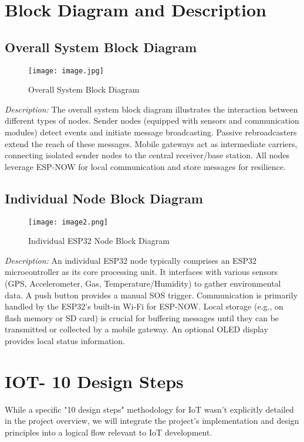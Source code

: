 \documentclass[12pt, a4paper]{article}
\begin{document}
\section{Block Diagram and Description} 
\subsection{Overall System Block Diagram}
\begin{figure}[H]
    \centering
    \texttt{[image: image.jpg]} %
    \caption{Overall System Block Diagram}
    \label{fig:system_block_diagram}
\end{figure}
\textit{Description:} The overall system block diagram illustrates the interaction between different types of nodes. Sender nodes (equipped with sensors and communication modules) detect events and initiate message broadcasting. Passive rebroadcasters extend the reach of these messages. Mobile gateways act as intermediate carriers, connecting isolated sender nodes to the central receiver/base station. All nodes leverage ESP-NOW for local communication and store messages for resilience.


\subsection{Individual Node Block Diagram}
\begin{figure}[H]
    \centering
    \texttt{[image: image2.png]} %
    \caption{Individual ESP32 Node Block Diagram}
    \label{fig:node_block_diagram}
\end{figure}
\textit{Description:} An individual ESP32 node typically comprises an ESP32 microcontroller as its core processing unit. It interfaces with various sensors (GPS, Accelerometer, Gas, Temperature/Humidity) to gather environmental data. A push button provides a manual SOS trigger. Communication is primarily handled by the ESP32's built-in Wi-Fi for ESP-NOW. Local storage (e.g., on flash memory or SD card) is crucial for buffering messages until they can be transmitted or collected by a mobile gateway. An optional OLED display provides local status information.

\section{IOT- 10 Design Steps} 
While a specific "10 design steps" methodology for IoT wasn't explicitly detailed in the project overview, we will integrate the project's implementation and design principles into a logical flow relevant to IoT development.
\end{document}
